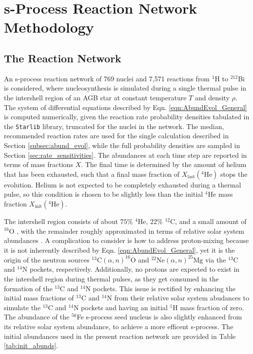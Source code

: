 \section{s-Process Reaction Network Methodology} \label{sec:network_method}

\subsection{The Reaction Network} \label{subsec:the_reaction_network}


An s-process reaction network of 769 nuclei and 7,571 reactions from $^{1}$H to $^{212}$Bi is considered, where nucleosynthesis is simulated during a single thermal pulse in the intershell region of an AGB star at constant temperature $T$ and density $\rho$. The system of differential equations described by Eqn. \ref{eqn:AbundEvol_General} is computed numerically, given the reaction rate probability densities tabulated in the \texttt{Starlib} \cite{Sallaska2013} library, truncated for the nuclei in the network. The median, recommended reaction rates are used for the single calculation described in Section \ref{subsec:abund_evol}, while the full probability densities are sampled in Section \ref{sec:rate_sensitivities}. The abundances at each time step are reported in terms of mass fractions $X$. The final time is determined by the amount of helium that has been exhausted, such that a final mass fraction of $X_{\mathrm{last}}(^{4}\mathrm{He})$ stops the evolution. Helium is not expected to be completely exhausted during a thermal pulse, so this condition is chosen to be slightly less than the initial $^{4}$He mass fraction $X_{\mathrm{init}}(^{4}\mathrm{He})$.

The intershell region consists of about $75\%$ $^{4}$He, $22\%$ $^{12}$C, and a small amount of $^{16}$O \cite{Habing2004}, with the remainder roughly approximated in terms of relative solar system abundances \cite{Lodders2009}. A complication to consider is how to address proton-mixing because it is not inherently described by Eqn. \ref{eqn:AbundEvol_General}, yet it is the origin of the neutron sources $^{13}\mathrm{C}(\alpha,n)^{16}\mathrm{O}$ and $^{22}\mathrm{Ne}(\alpha,n)^{25}\mathrm{Mg}$ via the $^{13}$C and $^{14}$N pockets, respectively. Additionally, no protons are expected to exist in the intershell region during thermal pulses, as they get consumed in the formation of the $^{13}$C and $^{14}$N pockets. This issue is rectified by enhancing the initial mass fractions of $^{13}$C and $^{14}$N from their relative solar system abudances to simulate the $^{13}$C and $^{14}$N pockets and having an initial $^{1}$H mass fraction of zero. The abundance of the $^{56}$Fe s-process seed nucleus is also slightly enhanced from its relative solar system abundance, to achieve a more efficent s-process. The initial abundances used in the present reaction network are provided in Table \ref{tab:init_abunds}.

